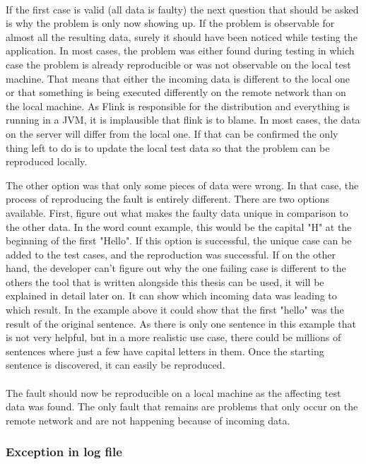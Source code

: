 \paragraph{} If the first case is valid (all data is faulty) the next question that should be asked is why the problem is only now showing up. If the problem is observable for almost all the resulting data, surely it should have been noticed while testing the application. In most cases, the problem was either found during testing in which case the problem is already reproducible or was not observable on the local test machine. That means that either the incoming data is different to the local one or that something is being executed differently on the remote network than on the local machine. As Flink is responsible for the distribution and everything is running in a JVM, it is implausible that flink is to blame. In most cases, the data on the server will differ from the local one. If that can be confirmed the only thing left to do is to update the local test data so that the problem can be reproduced locally.

The other option was that only some pieces of data were wrong. In that case, the process of reproducing the fault is entirely different. There are two options available. First, figure out what makes the faulty data unique in comparison to the other data. In the word count example, this would be the capital "H" at the beginning of the first "Hello". If this option is successful, the unique case can be added to the test cases, and the reproduction was successful. If on the other hand, the developer can't figure out why the one failing case is different to the others the tool that is written alongside this thesis can be used, it will be explained in detail later on. It can show which incoming data was leading to which result. In the example above it could show that the first "hello" was the result of the original sentence. As there is only one sentence in this example that is not very helpful, but in a more realistic use case, there could be millions of sentences where just a few have capital letters in them. Once the starting sentence is discovered, it can easily be reproduced.

\paragraph{} The fault should now be reproducible on a local machine as the affecting test data was found. The only fault that remains are problems that only occur on the remote network and are not happening because of incoming data.

\subsubsection{Exception in log file}
